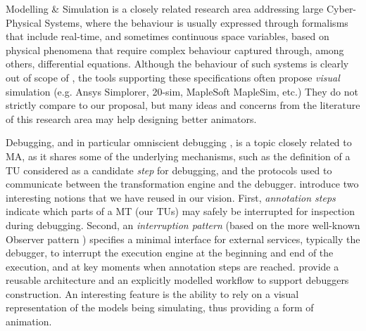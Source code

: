Modelling \& Simulation \cite{B:Birta-Arbez:2019} is a closely related research 
area addressing large Cyber-Physical Systems, where the behaviour is usually expressed
through formalisms that include real-time, and sometimes continuous space variables,
based on physical phenomena that require complex behaviour captured through, among
others, differential equations. Although the behaviour of such systems is clearly
out of scope of \MDE, the tools supporting these specifications often propose 
\emph{visual} simulation (e.g. Ansys Simplorer, 20-sim, MapleSoft MapleSim, etc.)
They do not strictly compare to our proposal, but many ideas and concerns from the
literature of this research area may help designing better animators. 

Debugging, and in particular omniscient debugging 
\citep{bousse2018omniscient,J:Corley-Eddy-Syriani-Grey:2016,J:VanMierlo-Vangheluwe-etAl:2020},
is a topic closely related to MA, as it shares some of the underlying mechanisms,
such as the definition of a TU considered as a candidate \emph{step} for debugging,
and the protocols used to communicate between the transformation engine and the debugger.
\citet{bousse2018omniscient} introduce two interesting notions that we have reused
in our vision. First, \emph{annotation steps} indicate which parts of a MT (our TUs) may safely
be interrupted for inspection during debugging. Second, an \emph{interruption pattern}
(based on the more well-known Observer pattern \cite{B:Gamma-etAl:1995}) specifies
a minimal interface for external services, typically the debugger, to interrupt
the execution engine at the beginning and end of the execution, and at key moments
when annotation steps are reached. \citet{J:VanMierlo-Vangheluwe-etAl:2020} provide
a reusable architecture and an explicitly modelled workflow to support debuggers
construction. An interesting feature is the ability to rely on a visual representation
of the models being simulating, thus providing a form of animation.
